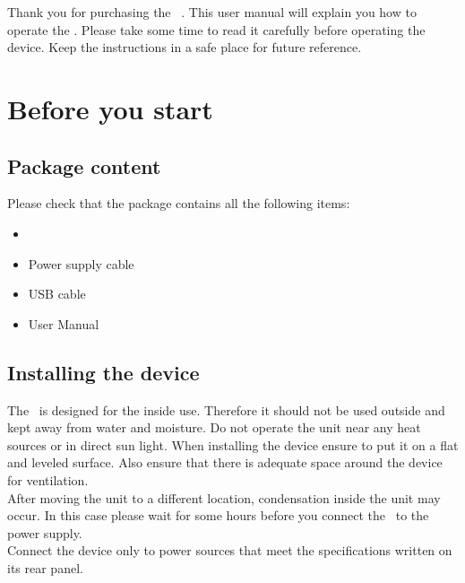 Thank you for purchasing the \productNumber ~\productName. This user manual will explain you how to operate the \productName. Please take some time to read it carefully before operating the device. Keep the instructions in a safe place for future reference.

\section{Before you start}
\subsection{Package content}
Please check that the package contains all the following items:
\begin{itemize}
\item \productNumber ~\productName
\item Power supply cable
\item USB cable
\item User Manual
\end{itemize}

\subsection{Installing the device}
The \productName ~is designed for the inside use. Therefore it should not be used outside and kept away from water and moisture. Do not operate the unit near any heat sources or in direct sun light. When installing the device ensure to put it on a flat and leveled surface. Also ensure that there is adequate space around the device for ventilation.\\
After moving the unit to a different location, condensation inside the unit may occur. In this case please wait for some hours before you connect the \productName ~to the power supply.\\
Connect the device only to power sources that meet the specifications written on its rear panel.






\newpage